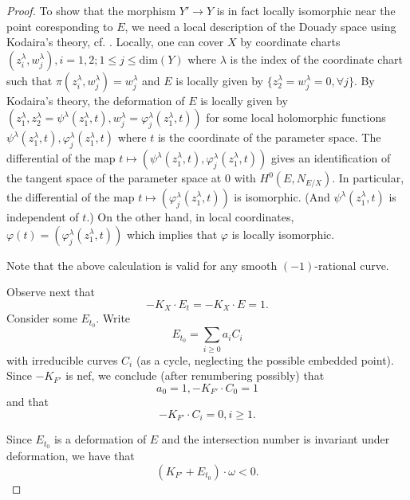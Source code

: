 \documentclass[a4, 12pt]{amsart}
\numberwithin{equation}{section}
\theoremstyle{definition}
\def\P{\mathbb{P}}
\def\P{\mathbb{P}}
\def \dim{\mathrm{dim}}
\begin{document}
\begin{proof}
To show that the morphism $Y' \to Y$ is in fact locally isomorphic near the point coresponding to $E$, we need a local description of the Douady space using Kodaira's theory, cf. \cite{Kod62}.
Locally, one can cover $X$ by coordinate charts $(z_i^\lambda,w_j^\lambda ), i=1,2; 1 \leq j \leq \dim(Y)$ where $\lambda$ is the index of the coordinate chart such that $\pi(z_i^\lambda,w_j^\lambda)=w_j^\lambda$ and $E$ is locally given by $\{z_2^\lambda= w_j^\lambda=0, \forall j \}$.
By Kodaira's theory, the deformation of $E$ is locally given by $(z_1^\lambda, z_2^\lambda=\psi^\lambda(z_1^\lambda, t), w_j^\lambda=\varphi_j^\lambda(z_1^\lambda, t) )$
for some local holomorphic functions $\psi^\lambda(z_1^\lambda, t), \varphi_j^\lambda(z_1^\lambda, t)$ where $t$ is the coordinate of the parameter space.
The differential of the map $t \mapsto (\psi^\lambda(z_1^\lambda, t), \varphi_j^\lambda(z_1^\lambda, t))$ gives an identification of the tangent space of the parameter space at 0 with $H^0(E, N_{E/X})$.
In particular, the differential of the map $t \mapsto ( \varphi_j^\lambda(z_1^\lambda, t))$ is isomorphic.
(And $\psi^\lambda(z_1^\lambda, t)$ is independent of $t$.)
On the other hand, in local coordinates,
$\varphi(t)=(\varphi_j^\lambda(z_1^\lambda, t))$
which implies that $\varphi$ is locally isomorphic.

Note that the above calculation is valid for any smooth $(-1)$-rational curve.

Observe next that
$$ -K_X \cdot E_t = -K_X \cdot E = 1.$$
Consider some $E_{t_0}$.
Write
$$ E_{t_0} = \sum_{i \geq 0} a_i C_i $$
with irreducible curves $C_i$ (as a cycle, neglecting the possible embedded point). Since $-K_{F'}$ is nef, we conclude (after renumbering possibly) that
$$a_0 = 1, -K_{F'}\cdot C_0 = 1$$
and that
$$-K_{F'}\cdot C_i = 0, i \geq 1.$$

Since $E_{t_0}$ is a deformation of $E$ and the intersection number is invariant under deformation,
we have that
$$(K_{F'}+E_{t_0}) \cdot \omega <0.$$


\end{proof}
\end{document}
